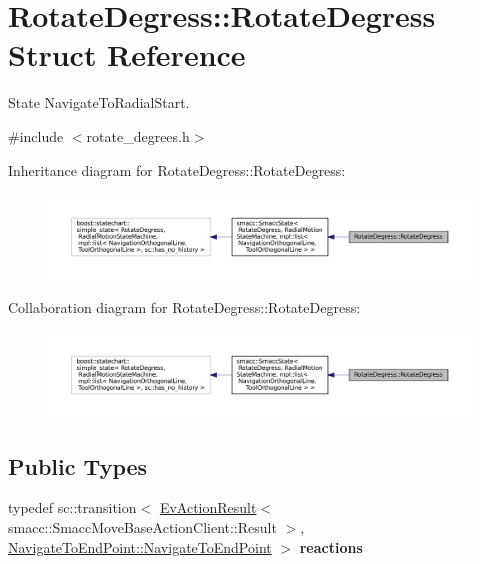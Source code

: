 \hypertarget{structRotateDegress_1_1RotateDegress}{}\section{Rotate\+Degress\+:\+:Rotate\+Degress Struct Reference}
\label{structRotateDegress_1_1RotateDegress}


State Navigate\+To\+Radial\+Start.  




{\ttfamily \#include $<$rotate\+\_\+degrees.\+h$>$}



Inheritance diagram for Rotate\+Degress\+:\+:Rotate\+Degress\+:
\nopagebreak
\begin{figure}[H]
\begin{center}
\leavevmode
\includegraphics[width=350pt]{structRotateDegress_1_1RotateDegress__inherit__graph}
\end{center}
\end{figure}


Collaboration diagram for Rotate\+Degress\+:\+:Rotate\+Degress\+:
\nopagebreak
\begin{figure}[H]
\begin{center}
\leavevmode
\includegraphics[width=350pt]{structRotateDegress_1_1RotateDegress__coll__graph}
\end{center}
\end{figure}
\subsection*{Public Types}
\begin{DoxyCompactItemize}
\item 
\mbox{\label{structRotateDegress_1_1RotateDegress_ae589629aa225feb6a2bc2bc702bd088f}} 
typedef sc\+::transition$<$ \hyperlink{structsmacc_1_1EvActionResult}{Ev\+Action\+Result}$<$ smacc\+::\+Smacc\+Move\+Base\+Action\+Client\+::\+Result $>$, \hyperlink{structNavigateToEndPoint_1_1NavigateToEndPoint}{Navigate\+To\+End\+Point\+::\+Navigate\+To\+End\+Point} $>$ {\bfseries reactions}
\end{DoxyCompactItemize}
